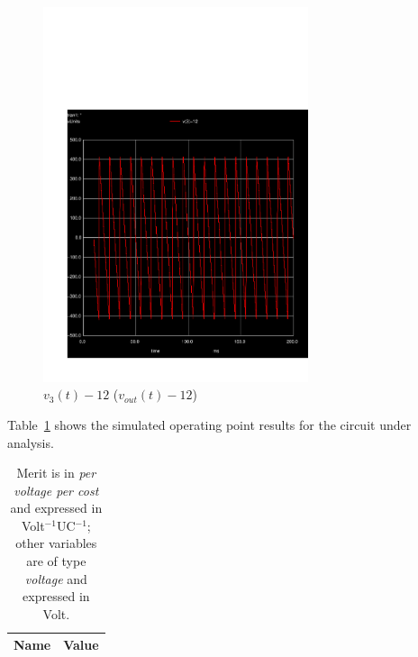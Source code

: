 \begin{figure}[h] \centering
\vspace{-3cm}
\includegraphics[height=11cm]{../sim/trans5.pdf}
\caption{$v_{3}(t)-12$ ($v_{out}(t)-12$)}
\label{fig:SIM_OUT-12}
\end{figure}

\newpage

Table~\ref{tab:SIM_RES} shows the simulated operating point results for the circuit under analysis.
\begin{table}[h]
  \centering
  \begin{tabular}{|l|r|}
    \hline    
    {\bf Name} & {\bf Value} \\ \hline
    
  \end{tabular}
  \caption{Merit is in {\it per voltage per cost} and expressed in Volt$^{-1}$UC$^{-1}$; other variables are of type {\it voltage} and expressed in Volt.}
  \label{tab:SIM_RES}
\end{table}



